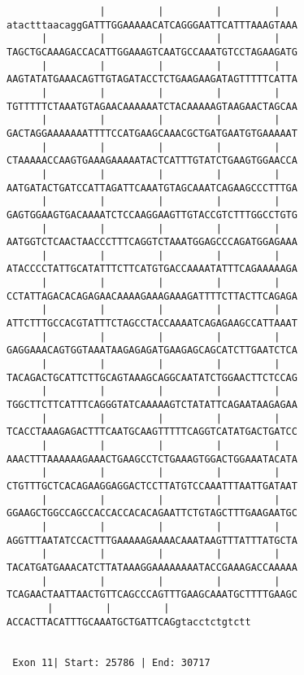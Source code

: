 \documentclass{article}
\begin{document}
\begin{Verbatim}
                |         |         |         |   
atactttaacaggGATTTGGAAAAACATCAGGGAATTCATTTAAAGTAAA
      |         |         |         |         |   
TAGCTGCAAAGACCACATTGGAAAGTCAATGCCAAATGTCCTAGAAGATG
      |         |         |         |         |   
AAGTATATGAAACAGTTGTAGATACCTCTGAAGAAGATAGTTTTTCATTA
      |         |         |         |         |   
TGTTTTTCTAAATGTAGAACAAAAAATCTACAAAAAGTAAGAACTAGCAA
      |         |         |         |         |   
GACTAGGAAAAAAATTTTCCATGAAGCAAACGCTGATGAATGTGAAAAAT
      |         |         |         |         |   
CTAAAAACCAAGTGAAAGAAAAATACTCATTTGTATCTGAAGTGGAACCA
      |         |         |         |         |   
AATGATACTGATCCATTAGATTCAAATGTAGCAAATCAGAAGCCCTTTGA
      |         |         |         |         |   
GAGTGGAAGTGACAAAATCTCCAAGGAAGTTGTACCGTCTTTGGCCTGTG
      |         |         |         |         |   
AATGGTCTCAACTAACCCTTTCAGGTCTAAATGGAGCCCAGATGGAGAAA
      |         |         |         |         |   
ATACCCCTATTGCATATTTCTTCATGTGACCAAAATATTTCAGAAAAAGA
      |         |         |         |         |   
CCTATTAGACACAGAGAACAAAAGAAAGAAAGATTTTCTTACTTCAGAGA
      |         |         |         |         |   
ATTCTTTGCCACGTATTTCTAGCCTACCAAAATCAGAGAAGCCATTAAAT
      |         |         |         |         |   
GAGGAAACAGTGGTAAATAAGAGAGATGAAGAGCAGCATCTTGAATCTCA
      |         |         |         |         |   
TACAGACTGCATTCTTGCAGTAAAGCAGGCAATATCTGGAACTTCTCCAG
      |         |         |         |         |   
TGGCTTCTTCATTTCAGGGTATCAAAAAGTCTATATTCAGAATAAGAGAA
      |         |         |         |         |   
TCACCTAAAGAGACTTTCAATGCAAGTTTTTCAGGTCATATGACTGATCC
      |         |         |         |         |   
AAACTTTAAAAAAGAAACTGAAGCCTCTGAAAGTGGACTGGAAATACATA
      |         |         |         |         |   
CTGTTTGCTCACAGAAGGAGGACTCCTTATGTCCAAATTTAATTGATAAT
      |         |         |         |         |   
GGAAGCTGGCCAGCCACCACCACACAGAATTCTGTAGCTTTGAAGAATGC
      |         |         |         |         |   
AGGTTTAATATCCACTTTGAAAAAGAAAACAAATAAGTTTATTTATGCTA
      |         |         |         |         |   
TACATGATGAAACATCTTATAAAGGAAAAAAAATACCGAAAGACCAAAAA
      |         |         |         |         |   
TCAGAACTAATTAACTGTTCAGCCCAGTTTGAAGCAAATGCTTTTGAAGC
       |         |         | 
ACCACTTACATTTGCAAATGCTGATTCAGgtacctctgtctt


 Exon 11| Start: 25786 | End: 30717 





\end{Verbatim}
\end{document}
